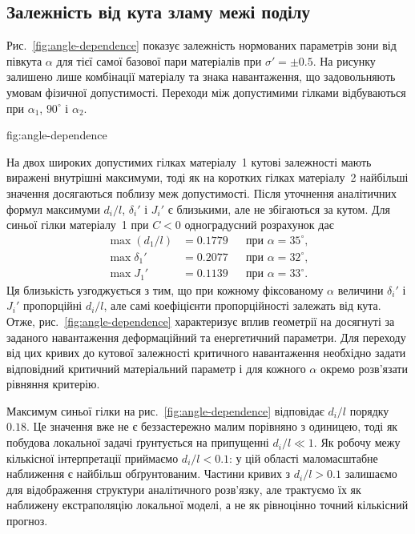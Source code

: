 \subsection{Залежність від кута зламу межі поділу}
\label{subsec:figure3}

Рис.~\ref{fig:angle-dependence} показує залежність нормованих параметрів
зони від півкута $\alpha$ для тієї самої базової пари матеріалів при
$\sigma'=\pm0.5$. На рисунку залишено лише комбінації матеріалу та знака
навантаження, що задовольняють умовам фізичної допустимості. Переходи між
допустимими гілками відбуваються при $\alpha_1$,
$90^\circ$ і $\alpha_2$.

%
{fig:angle-dependence}

На двох широких допустимих гілках матеріалу~1 кутові залежності мають
виражені внутрішні максимуми, тоді як на коротких гілках матеріалу~2
найбільші значення досягаються поблизу меж допустимості. Після уточнення
аналітичних формул максимуми $d_i/l$, $\delta_i'$ і $J_i'$ є близькими,
але не збігаються за кутом. Для синьої гілки матеріалу~1 при $C<0$
одноградусний розрахунок дає
\begin{equation*}
\begin{aligned}
  \max(d_1/l)&=0.1779 &&\text{при }\alpha=35^\circ,\\
  \max\delta_1'&=0.2077 &&\text{при }\alpha=32^\circ,\\
  \max J_1'&=0.1139 &&\text{при }\alpha=33^\circ.
\end{aligned}
\end{equation*}
Ця близькість узгоджується з тим, що при кожному фіксованому $\alpha$
величини $\delta_i'$ і $J_i'$ пропорційні $d_i/l$, але самі коефіцієнти
пропорційності залежать від кута. Отже, рис.~\ref{fig:angle-dependence}
характеризує вплив геометрії на досягнуті за заданого навантаження
деформаційний та енергетичний параметри. Для переходу від цих кривих до
кутової залежності критичного навантаження необхідно задати відповідний
критичний матеріальний параметр і для кожного $\alpha$ окремо розв'язати
рівняння критерію.

Максимум синьої гілки на рис.~\ref{fig:angle-dependence} відповідає
$d_i/l$ порядку $0.18$. Це значення вже не є беззастережно малим порівняно
з одиницею, тоді як побудова локальної задачі ґрунтується на припущенні
$d_i/l\ll1$. Як робочу межу кількісної інтерпретації приймаємо
$d_i/l<0.1$: у цій області маломасштабне наближення є найбільш
обґрунтованим. Частини кривих з $d_i/l>0.1$ залишаємо для відображення
структури аналітичного розв'язку, але трактуємо їх як наближену
екстраполяцію локальної моделі, а не як рівноцінно точний кількісний
прогноз.

